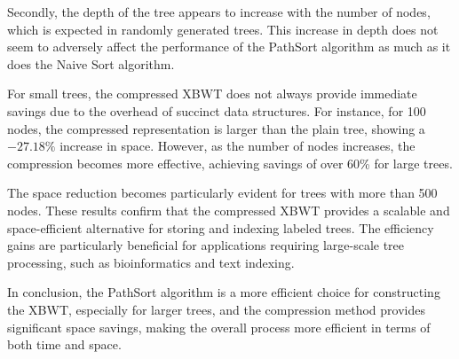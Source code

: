 Secondly, the depth of the tree appears to increase with the number of nodes, which is expected in randomly generated trees. This increase in depth does not seem to adversely affect the performance of the PathSort algorithm as much as it does the Naive Sort algorithm.

For small trees, the compressed XBWT does not always provide immediate savings due to the overhead of succinct data structures. For instance, for 100 nodes, the compressed representation is larger than the plain tree, showing a \(-27.18\%\) increase in space. However, as the number of nodes increases, the compression becomes more effective, achieving savings of over 60\% for large trees.

The space reduction becomes particularly evident for trees with more than 500 nodes. These results confirm that the compressed XBWT provides a scalable and space-efficient alternative for storing and indexing labeled trees. The efficiency gains are particularly beneficial for applications requiring large-scale tree processing, such as bioinformatics and text indexing.

In conclusion, the PathSort algorithm is a more efficient choice for constructing the XBWT, especially for larger trees, and the compression method provides significant space savings, making the overall process more efficient in terms of both time and space.
